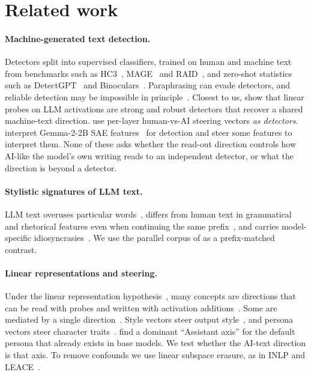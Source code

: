 \section{Related work}
\label{sec:related}

\paragraph{Machine-generated text detection.} Detectors split into supervised classifiers, trained on human and machine text from benchmarks such as HC3~\citep{guo2023hc3}, MAGE~\citep{li2024mage} and RAID~\citep{dugan2024raid}, and zero-shot statistics such as DetectGPT~\citep{mitchell2023detectgpt} and Binoculars~\citep{hans2024binoculars}. Paraphrasing can evade detectors, and reliable detection may be impossible in principle~\citep{krishna2023paraphrasing,sadasivan2023can}. Closest to us, \citet{quaremba2026linear} show that linear probes on LLM activations are strong and robust detectors that recover a shared machine-text direction. \citet{vishnyakov2026svdetect} use per-layer human-vs-AI steering vectors \emph{as detectors}. \citet{kuznetsov2025feature} interpret Gemma-2-2B SAE features~\citep{lieberum2024gemmascope} for detection and steer some features to interpret them. None of these asks whether the read-out direction controls how AI-like the model's own writing reads to an independent detector, or what the direction is beyond a detector.

\paragraph{Stylistic signatures of LLM text.} LLM text overuses particular words~\citep{kobak2025delving,liang2024monitoring,liang2024mapping}, differs from human text in grammatical and rhetorical features even when continuing the same prefix~\citep{reinhart2025llms}, and carries model-specific idiosyncrasies~\citep{sun2025idiosyncrasies}. We use the parallel corpus of \citet{reinhart2025llms} as a prefix-matched contrast.

\paragraph{Linear representations and steering.} Under the linear representation hypothesis~\citep{park2024linear}, many concepts are directions that can be read with probes and written with activation additions~\citep{turner2023steering,zou2023representation,li2023inference,rimsky2024steering}. Some are mediated by a single direction~\citep{arditi2024refusal}. Style vectors steer output style~\citep{konen2024style}, and persona vectors steer character traits~\citep{chen2025persona}. \citet{lu2026assistant} find a dominant ``Assistant axis'' for the default persona that already exists in base models. We test whether the AI-text direction is that axis. To remove confounds we use linear subspace erasure, as in INLP and LEACE~\citep{ravfogel2020null,belrose2023leace}.
